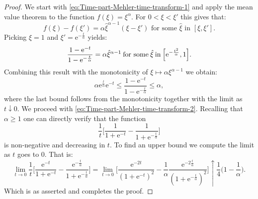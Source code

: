 \documentclass[a4paper,oneside,10pt]{amsproc}
\theoremstyle{plain}
\theoremstyle{remark}
\renewcommand{\leq}{\leqslant}
\renewcommand{\leq}{\leqslant}
\renewcommand{\geq}{\geqslant}
\newcommand{\e}{\mathrm{e}} %
\renewcommand{\leq}{\leqslant}%
\renewcommand{\geq}{\geqslant}%
\begin{document}
\begin{proof}
  We start with \eqref{eq:Time-part-Mehler-time-transform-1} and apply
  the mean value theorem to the function $f(\xi) = \xi^\alpha$. For $0
  < \xi < \xi'$ this gives that:
  \begin{equation*}
    f(\xi) - f(\xi') = \alpha \hat{\xi}^{\alpha - 1} (\xi - \xi')
    \text{ for some $\hat \xi$ in $[\xi, \xi']$}.
  \end{equation*}
  Picking $\xi = 1$ and $\xi' = \e^{-\frac{t}{\alpha}}$ yields:
  \begin{equation}
    \label{eq:Time-part-Mehler-time-transform-proof-1}
    \frac{1 - \e^{-t}}{1 - \e^{-\frac{t}{\alpha}}} = \alpha
    \hat{\xi}^{\alpha - 1} \:\text{for some}\: \hat{\xi} \:\text{in}\:
    \Bigl[\e^{-\frac{t^2}{\alpha}}, 1 \Bigr].
  \end{equation}
  Combining this result with the monotonicity of $\xi \mapsto
  \alpha \xi^{\alpha - 1}$ we obtain:
  \begin{equation*}
    \alpha \e^{\frac{t}{\alpha}} \e^{-t} \leq \frac{1 - \e^{-t}}{1 -
      \e^{-\frac{t}{\alpha}}} \leq \alpha,
  \end{equation*}
  where the last bound follows from the monotonicity together with the
  limit as $t \downarrow 0$.
  We proceed with \eqref{eq:Time-part-Mehler-time-transform-2}.
  Recalling that $\alpha \geq 1$ one can directly verify that the
  function
  \begin{equation*}
    \frac1t \biggl[\frac{1}{1 + \e^{-t}} - \frac{1}{1 +
      \e^{-\frac{t}{\alpha}}} \biggr]
  \end{equation*}
  is non-negative and decreasing in $t$. To find
  an upper bound we compute the limit as $t$ goes to $0$. That is:
  \begin{equation*}
    \lim_{t \to 0} \frac1t \biggl[\frac{\e^{-t}}{1 + \e^{-t}} -
    \frac{\e^{-\frac{t}\alpha}}{1 + \e^{-\frac{t}{\alpha}}} \biggr] 
    = \lim_{t \to 0} \biggl[\frac{\e^{-2t}}{(1 + \e^{-t})^2} -
    \frac1\alpha \frac{\e^{-2\frac{t}{\alpha}}}{(1 +
      \e^{-\frac{t}{\alpha}})^2} \biggr] \uparrow \frac{1}{4} \biggl(1
    - \frac1\alpha \biggr).
  \end{equation*}
  Which is as asserted and completes the proof.
\end{proof}
\end{document}
